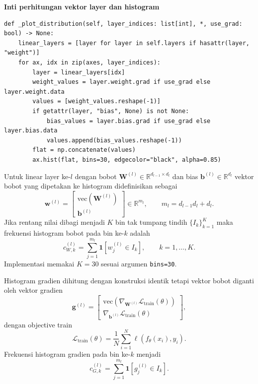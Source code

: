 \documentclass{article}
\begin{document}
\noindent\textbf{Inti perhitungan vektor layer dan histogram}\par
\begin{lstlisting}
def _plot_distribution(self, layer_indices: list[int], *, use_grad: bool) -> None:
    linear_layers = [layer for layer in self.layers if hasattr(layer, "weight")]
    for ax, idx in zip(axes, layer_indices):
        layer = linear_layers[idx]
        weight_values = layer.weight.grad if use_grad else layer.weight.data
        values = [weight_values.reshape(-1)]
        if getattr(layer, "bias", None) is not None:
            bias_values = layer.bias.grad if use_grad else layer.bias.data
            values.append(bias_values.reshape(-1))
        flat = np.concatenate(values)
        ax.hist(flat, bins=30, edgecolor="black", alpha=0.85)
\end{lstlisting}
Untuk linear layer ke-$l$ dengan bobot $\mathbf{W}^{(l)}\in\mathbb{R}^{d_{l-1}\times d_l}$ dan bias $\mathbf{b}^{(l)}\in\mathbb{R}^{d_l}$ vektor bobot yang dipetakan ke histogram didefinisikan sebagai
\begin{equation}
\mathbf{w}^{(l)}=
\begin{bmatrix}
\mathrm{vec}\!\left(\mathbf{W}^{(l)}\right)\\
\mathbf{b}^{(l)}
\end{bmatrix}
\in\mathbb{R}^{m_l},
\qquad
m_l=d_{l-1}d_l+d_l.
\end{equation}
Jika rentang nilai dibagi menjadi $K$ bin tak tumpang tindih $\{I_k\}_{k=1}^K$ maka frekuensi histogram bobot pada bin ke-$k$ adalah
\begin{equation}
c^{(l)}_{W,k}
=
\sum_{j=1}^{m_l}
\mathbf{1}\!\left[w^{(l)}_j\in I_k\right],
\qquad
k=1,\dots,K.
\end{equation}
Implementasi memakai $K=30$ sesuai argumen \texttt{bins=30}.

Histogram gradien dihitung dengan konstruksi identik tetapi vektor bobot diganti oleh vektor gradien
\begin{equation}
\mathbf{g}^{(l)}=
\begin{bmatrix}
\mathrm{vec}\!\left(\nabla_{\mathbf{W}^{(l)}}\mathcal{L}_{\mathrm{train}}(\theta)\right)\\
\nabla_{\mathbf{b}^{(l)}}\mathcal{L}_{\mathrm{train}}(\theta)
\end{bmatrix},
\end{equation}
dengan objective train
\begin{equation}
\mathcal{L}_{\mathrm{train}}(\theta)=
\frac{1}{N}\sum_{i=1}^{N}\ell\!\left(f_\theta(x_i),y_i\right).
\end{equation}
Frekuensi histogram gradien pada bin ke-$k$ menjadi
\begin{equation}
c^{(l)}_{G,k}
=
\sum_{j=1}^{m_l}
\mathbf{1}\!\left[g^{(l)}_j\in I_k\right].
\end{equation}
\end{document}
